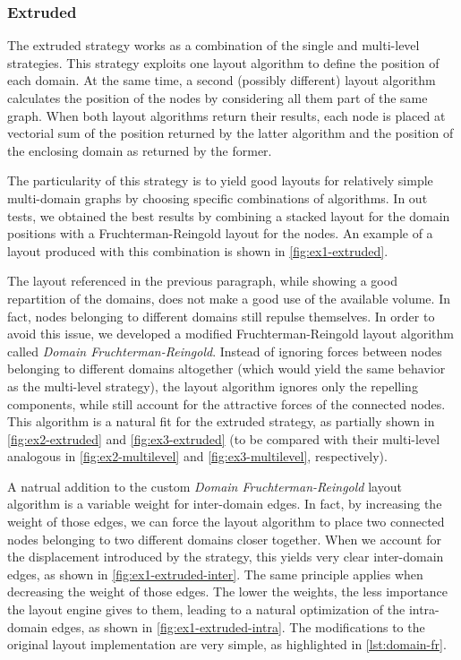 \subsubsection{Extruded}

The extruded strategy works as a combination of the single and multi-level strategies. This strategy exploits one layout algorithm to define the position of each domain. At the same time, a second (possibly different) layout algorithm calculates the position of the nodes by considering all them part of the same graph. When both layout algorithms return their results, each node is placed at vectorial sum of the position returned by the latter algorithm and the position of the enclosing domain as returned by the former.

The particularity of this strategy is to yield good layouts for relatively simple multi-domain graphs by choosing specific combinations of algorithms. In out tests, we obtained the best results by combining a stacked layout for the domain positions with a Fruchterman-Reingold layout for the nodes. An example of a layout produced with this combination is shown in \vref{fig:ex1-extruded}.

The layout referenced in the previous paragraph, while showing a good repartition of the domains, does not make a good use of the available volume. In fact, nodes belonging to different domains still repulse themselves. In order to avoid this issue, we developed a modified Fruchterman-Reingold layout algorithm called \emph{Domain Fruchterman-Reingold}. Instead of ignoring forces between nodes belonging to different domains altogether (which would yield the same behavior as the multi-level strategy), the layout algorithm ignores only the repelling components, while still account for the attractive forces of the connected nodes. This algorithm is a natural fit for the extruded strategy, as partially shown in \vref{fig:ex2-extruded} and \vref{fig:ex3-extruded} (to be compared with their multi-level analogous in \vref{fig:ex2-multilevel} and \vref{fig:ex3-multilevel}, respectively).

A natrual addition to the custom \emph{Domain Fruchterman-Reingold} layout algorithm is a variable weight for inter-domain edges. In fact, by increasing the weight of those edges, we can force the layout algorithm to place two connected nodes belonging to two different domains closer together. When we account for the displacement introduced by the strategy, this yields very clear inter-domain edges, as shown in \vref{fig:ex1-extruded-inter}. The same principle applies when decreasing the weight of those edges. The lower the weights, the less importance the layout engine gives to them, leading to a natural optimization of the intra-domain edges, as shown in \vref{fig:ex1-extruded-intra}. The modifications to the original layout implementation are very simple, as highlighted in \vref{lst:domain-fr}.

